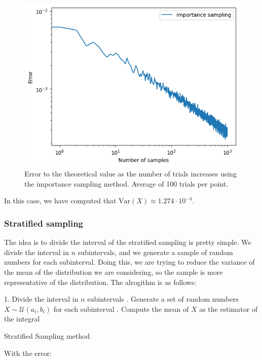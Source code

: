 \documentclass{article}
\begin{document}
\begin{figure}[H]
	\centering
	\includegraphics[width=0.5\linewidth]{./Figures/VarianceReduction/importance.png}
	\caption{Error to the theoretical value as the number of trials increases using the importance sampling method. Average of 100 trials per point.}
	\label{fig:importancesampling}
\end{figure}

In this case, we have computed that \(\mathrm{Var}(X) \approx 1.274 \cdot 10^{-4}\).

\subsubsection{Stratified sampling}
\label{sec:stratified_sampling}

The idea is to divide the interval of the stratified sampling is pretty simple. We divide the interval in \(n\) subintervals, and we generate a sample of random numbers for each subinterval. Doing this, we are trying to reduce the variance of the mean of the distribution we are considering, so the sample is more representative of the distribution. The alrogithm is as follows:

\begin{center}
	\begin{minipage}{0.7\linewidth} %
		\begin{algorithm}[H]
			1. Divide the interval in \(n\) subintervals . Generate a set of random numbers \(X \sim \mathcal{U}(a_i,b_i)\) for each subinterval . Compute the mean of \(X\) as the estimator of the integral \;
			\caption{Stratified Sampling method} %
			\label{alg:stratifiedsampling}   %
		\end{algorithm}
	\end{minipage}
\end{center}

With the error:
\end{document}
